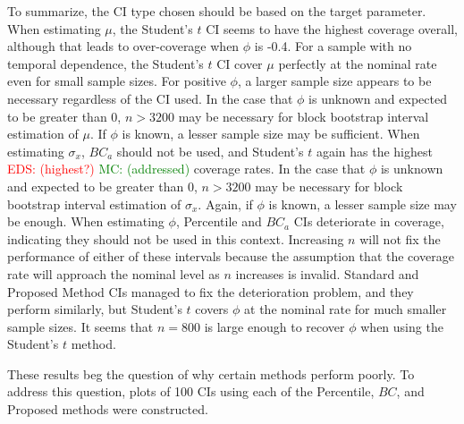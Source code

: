 \documentclass[12pt, letterpaper, titlepage]{article}
\newcommand{\eds}[1]{\textcolor{red}{EDS: (#1)}}
\newcommand{\mc}[1]{\textcolor{green}{MC: (#1)}}
\begin{document}
To summarize, the CI type chosen should be based on the target parameter. 
When estimating $\mu$, the Student's $t$ CI seems to have the highest coverage
overall, although that leads to over-coverage when $\phi$ is -0.4. For a
sample with no temporal dependence, the Student's $t$ CI cover $\mu$ perfectly
at the nominal rate even for small sample sizes. For positive $\phi$, a larger
sample size appears to be necessary regardless of the CI used. In the case
that $\phi$ is unknown and expected to be greater than $0$, $n > 3200$ may be
necessary for block bootstrap interval estimation of $\mu$. If $\phi$ is known,
a lesser sample size may be sufficient. When estimating $\sigma_x$,
$BC_a$ should not be used, and Student's $t$ again has the highest
\eds{highest?} \mc{addressed} coverage
rates. In the case that $\phi$ is unknown and expected to be greater than $0$,
$n > 3200$ may be necessary for block bootstrap interval estimation of
$\sigma_x$. Again, if $\phi$ is known, a lesser sample size may be enough.
When estimating $\phi$, Percentile and $BC_a$ CIs 
deteriorate in coverage, indicating they should not be used in this context. 
Increasing $n$ will not fix the performance of either of these intervals 
because the assumption that the coverage rate will approach the nominal level
as $n$ increases is invalid. Standard and Proposed Method CIs managed to fix the
deterioration problem, and they perform similarly, but Student's $t$ covers
$\phi$ at the nominal rate for much smaller sample sizes. It seems that 
$n = 800$ is large enough to
recover $\phi$ when using the Student's $t$ method.

These results beg the question of why certain methods perform poorly. To address 
this question, plots of 100 CIs using each of the Percentile, $BC$, and Proposed 
methods were constructed. 
\end{document}
